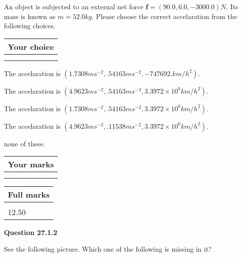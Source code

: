\documentclass[12pt]{article}
\begin{document}
  
 
An object is subjected to an external net force $\mathbf{f}=(
90.0 ,
6.0,
-3000.0  )N$. Its mass is known as
$m= %
52.0  kg$. Please choose the correct accelaration
from the following choices.
 
  
  
\noindent\hspace{3.0in} \begin{tabular}{|l|}
\hline
Your choice \\
\hline
 \\ 
 \\ 
\hline
\end{tabular}
  
  
 
 
The accelaration is
$(
1.7308ms^{-2},
.54163ms^{-2},
-747692.km/h^2
).
$
 
 
The accelaration is
$(
4.9623ms^{-2},
.54163ms^{-2},
3.3972 \times 10^{6}km/h^2
).
$
 
 
The accelaration is
$(
1.7308ms^{-2},
.54163ms^{-2},
3.3972 \times 10^{6}km/h^2
).
$
 
 
The accelaration is
$(
4.9623ms^{-2},
.11538ms^{-2},
3.3972 \times 10^{6}km/h^2
).
$
 
 
none of these.
 
 
 
 

 
\vspace{0.3in}
  
\vspace{0.2in}
  
         \begin{tabular}{|l|}
\hline
 Your marks  \\
\hline
 \\ 
 \\ 
\hline
\end{tabular}
\hspace{0.05in} \begin{tabular}{|l|}
\hline
 Full marks  \\
\hline
 \\ 
12.50 \\
\hline
\end{tabular}
{\textbf{\Large{Question
27.1.2 
}}}
  
  
See the following picture.
Which one of the following is missing in it?
  
\end{document}
